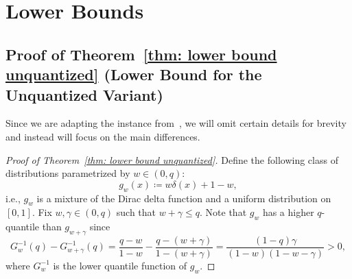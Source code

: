 \section{Lower Bounds}
\label{sec: appendix lower bound}

\subsection{Proof of Theorem~\ref{thm: lower bound unquantized} (Lower Bound for the Unquantized Variant)}
\label{sec: appendix unquantized lower bound}

Since we are adapting the instance from~\cite[Theorem  4]{nikolakakis2021quantile}, we will omit certain details for brevity and instead will focus on the main differences.

\begin{proof}[Proof of Theorem~\ref{thm: lower bound unquantized}]
    Define the following class of distributions parametrized by $w \in (0, q)$:
\begin{equation}
\label{eq: mix Dirac and uniform}
    g_{w}(x) \coloneqq
   w \delta(x) + 1-w,
\end{equation}
i.e., $g_w$ is a mixture of the Dirac delta function and a uniform distribution on $[0, 1]$. 
Fix $w,\gamma \in (0, q)$ such that $w+\gamma  \le q $. Note that $g_w$ has a higher $q$-quantile than $g_{w+\gamma}$ since
\begin{equation}
\label{eq: diff of arms}
    G^{-1}_w(q) -
    G^{-1}_{w+\gamma}(q) = 
    \frac{q - w}{1-w} - 
    \frac{q - (w+\gamma)}{1-(w+\gamma)} =
    \frac{(1-q)\gamma}{(1-w)(1-w-\gamma)}> 0,
\end{equation}
where $G_{w}^{-1}$ is the lower quantile function of $g_w$.



\end{proof}
